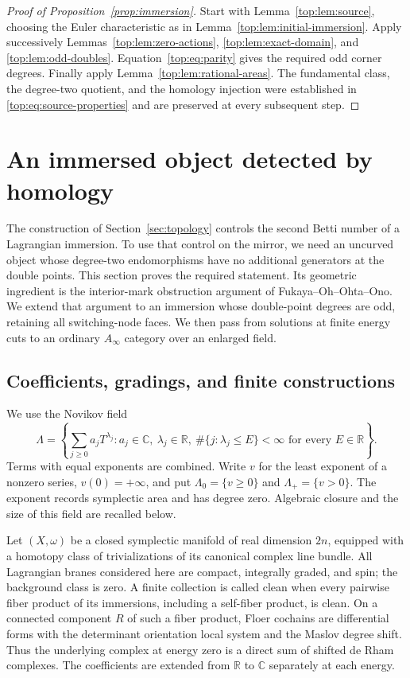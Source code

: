 \documentclass[11pt]{article}
\numberwithin{equation}{section}
\theoremstyle{definition}
\theoremstyle{remark}
\begin{document}
\begin{proof}[Proof of Proposition~\ref{prop:immersion}]
Start with Lemma~\ref{top:lem:source}, choosing the Euler
characteristic as in Lemma~\ref{top:lem:initial-immersion}.
Apply successively Lemmas~\ref{top:lem:zero-actions},
\ref{top:lem:exact-domain}, and \ref{top:lem:odd-doubles}.
Equation~\eqref{top:eq:parity} gives the required odd
corner degrees.  Finally apply
Lemma~\ref{top:lem:rational-areas}.  The fundamental
class, the degree-two quotient, and the homology
injection were established in
\eqref{top:eq:source-properties} and are preserved
at every subsequent step.
\end{proof}


\section{An immersed object detected by homology}
\label{sec:floer}

The construction of Section~\ref{sec:topology} controls the second Betti
number of a Lagrangian immersion.  To use that control on the mirror, we
need an uncurved object whose degree-two endomorphisms have no additional
generators at the double points.  This section proves the required
statement.  Its geometric ingredient is the interior-mark obstruction
argument of Fukaya--Oh--Ohta--Ono.  We extend that argument to an immersion
whose double-point degrees are odd, retaining all switching-node faces.
We then pass from solutions at finite energy cuts to an ordinary
$A_\infty$ category over an enlarged field.

\subsection{Coefficients, gradings, and finite constructions}
\label{subsec:floer-foundations}

We use the Novikov field
\[
 \Lambda=\left\{\sum_{j\geq0}a_jT^{\lambda_j}:
 a_j\in\mathbb C,\ \lambda_j\in\mathbb R,\
 \#\{j:\lambda_j\leq E\}<\infty\text{ for every }E\in\mathbb R\right\}.
\]
Terms with equal exponents are combined.  Write $v$ for the least exponent
of a nonzero series, $v(0)=+\infty$, and put
$\Lambda_0=\{v\geq0\}$ and $\Lambda_+=\{v>0\}$.
The exponent records symplectic area and has degree zero.  Algebraic
closure and the size of this field are recalled below.

Let $(X,\omega)$ be a closed symplectic manifold of real dimension $2n$,
equipped with a homotopy class of trivializations of its canonical complex
line bundle.  All Lagrangian branes considered here are compact,
integrally graded, and spin; the background class is zero.  A finite
collection is called clean when every pairwise fiber product of its
immersions, including a self-fiber product, is clean.  On a connected
component $R$ of such a fiber product, Floer cochains are differential
forms with the determinant orientation local system and the Maslov
degree shift.  Thus the underlying complex at energy zero is a direct
sum of shifted de Rham complexes.  The coefficients are extended from
$\mathbb R$ to $\mathbb C$ separately at each energy.
\end{document}
